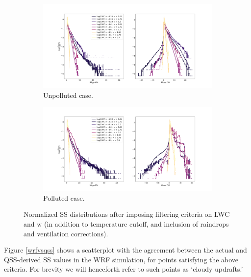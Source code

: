 \documentclass{article}
\begin{document}
\begin{figure}[ht]
	\centering
	\begin{subfigure}{1\textwidth}
		\includegraphics[width=\textwidth]{revmywrf/v4_ss_distb_charts_Unpolluted_figure.png}
		\caption{Unpolluted case.}
		\label{ssdistbsunpoll}
	\end{subfigure}
	\begin{subfigure}{1\textwidth}
		\includegraphics[width=\textwidth]{revmywrf/v4_ss_distb_charts_Polluted_figure.png}
		\caption{Polluted case.}
		\label{ssdistbspoll}
	\end{subfigure}
	\caption{Normalized SS distributions after imposing filtering criteria on LWC and w (in addition to temperature cutoff, and inclusion of raindrops and ventilation corrections).}
	\label{ssdistbs}
\end{figure}

Figure \ref{wrfvsqss} shows a scatterplot with the agreement between the actual and QSS-derived SS values in the WRF simulation, for points satisfying the above criteria. For brevity we will henceforth refer to such points as `cloudy updrafts.'

\clearpage
\newpage
\end{document}
